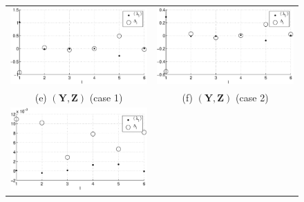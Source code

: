 {\begin{center}
\begin{figure}[h]
\begin{center}
\begin{tabular}{cc}
\includegraphics[scale=0.35]{NoisyMultiResponseExample_LandLCC_YZ1.eps} & \includegraphics[scale=0.35]{NoisyMultiResponseExample_LandLCC_YZ2.eps} \\
(e) $(\mathbf{Y},\mathbf{Z})$ (case 1) & (f) $(\mathbf{Y},\mathbf{Z})$ (case 2)\\
\includegraphics[scale=0.35]{NoisyMultiResponseExample_LandLCC_YZ3.eps} &  \\

\end{tabular}
\end{center}
\end{figure}
\end{center}}
